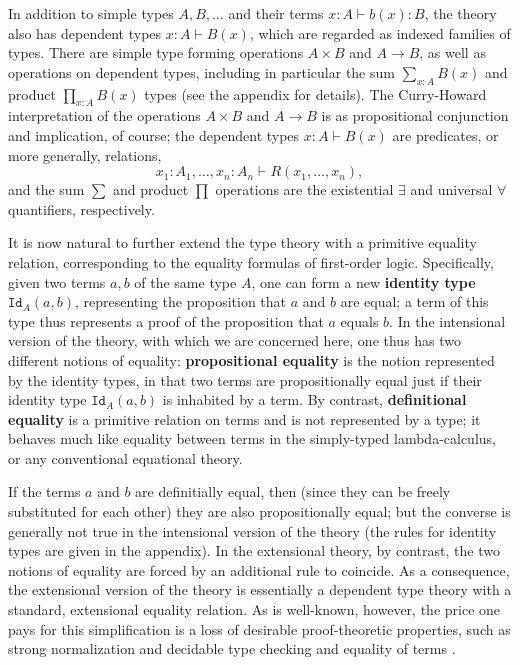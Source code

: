 \documentclass[reqno,12pt]{amsart}
\newcommand{\myemph}[1]{\textbf{#1}}    %
\newcommand{\id}[1]{\texttt{Id}_{#1}}
\theoremstyle{definition}
\theoremstyle{remark}
\begin{document}
In addition to simple types $A, B, \dots$ and their terms $ x:A \vdash b(x) : B$, the theory also has dependent types $x:A\vdash B(x)$, which are regarded as indexed families of types.  There are simple type forming operations $A\times B$ and $A\rightarrow B$, as well as operations on dependent types, including in particular the sum $\sum_{x:A}B(x)$ and product $\prod_{x:A}B(x)$ types (see the appendix for details).  The Curry-Howard interpretation of the operations $A\times B$ and $A\rightarrow B$ is as propositional conjunction and implication, of course; the dependent types  $x:A\vdash B(x)$ are predicates, or more generally, relations, $$x_1:A_1, \dots, x_n:A_n \vdash R(x_1,\dots,x_n),$$ and the sum $\sum$ and product $\prod$ operations are the existential $\exists$ and universal $\forall$ quantifiers, respectively. 

It is now natural to further extend the type theory with a primitive equality relation, corresponding to the equality formulas of first-order logic.  Specifically, given two terms $a,b$\/ of the same type $A$, one can form a new \myemph{identity type} $\id{A}(a,b)$, representing the proposition that $a$\/ and $b$\/ are equal; a term of this type thus represents a proof of the proposition that $a$ equals $b$.  In the intensional version of the theory, with which we are concerned here, one thus has two different notions of equality: \myemph{propositional equality} is the notion represented by the identity types, in that two terms are propositionally equal just if their identity type $\id{A}(a,b)$ is inhabited by a term.   By contrast, \myemph{definitional equality} is a primitive relation on terms and is not represented by a type; it behaves much like equality between terms in the simply-typed lambda-calculus, or any conventional equational theory. 

If the terms $a$\/ and $b$\/ are definitially equal, then (since they can be freely substituted for each other) they are also propositionally equal; but the converse is generally not true in the intensional version of the theory (the rules for identity types are given in the appendix).  In the extensional theory, by contrast, the two notions of equality are forced by an additional rule to coincide. As a consequence, the extensional version of the theory is essentially a dependent type theory with a standard, extensional equality relation. As is well-known, however, the price one pays for this simplification is a loss of desirable proof-theoretic properties, such as strong normalization and decidable type checking and equality of terms \cite{Streicher:IIITT,Streicher:STT,Hofmann:ECITT}.%
\end{document}
